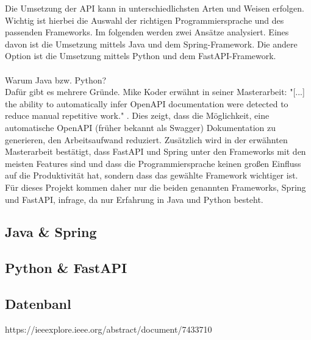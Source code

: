 Die Umsetzung der API kann in unterschiedlichsten Arten und Weisen erfolgen. Wichtig ist hierbei die Auswahl der richtigen Programmiersprache und des passenden Frameworks. Im folgenden werden zwei Ansätze analysiert. Eines davon ist die Umsetzung mittels Java und dem Spring-Framework. Die andere Option ist die Umsetzung mittels Python und dem FastAPI-Framework.
\\\\
Warum Java bzw. Python? 
\\
Dafür gibt es mehrere Gründe. Mike Koder erwähnt in seiner Masterarbeit: "[...] the ability to automatically infer OpenAPI documentation were detected to reduce manual repetitive work." \cite{koder2021increasing}. Dies zeigt, dass die Möglichkeit, eine automatische OpenAPI (früher bekannt als Swagger) Dokumentation zu generieren, den Arbeitsaufwand reduziert. Zusätzlich wird in der erwähnten Masterarbeit bestätigt, dass FastAPI und Spring unter den Frameworks mit den meisten Features sind und dass die Programmiersprache keinen großen Einfluss auf die Produktivität hat, sondern dass das gewählte Framework wichtiger ist. Für dieses Projekt kommen daher nur die beiden genannten Frameworks, Spring und FastAPI, infrage, da nur Erfahrung in Java und Python besteht. 


\subsection{Java \& Spring}



\subsection{Python \& FastAPI}

\subsection{Datenbanl}
https://ieeexplore.ieee.org/abstract/document/7433710